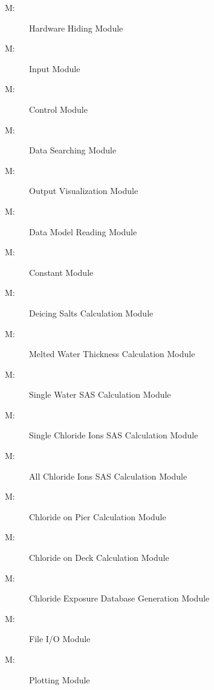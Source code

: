 \documentclass[12pt, titlepage]{article}
\newcounter{mnum}
\newcommand{\mthemnum}{M\themnum}
\begin{document}
\begin{description}
\item [ \mthemnum \label{mHardware}:] Hardware Hiding Module
\item [ \mthemnum \label{mInput}:] Input Module
\item [ \mthemnum \label{mControl}:] Control Module
\item [ \mthemnum \label{mSearch}:] Data Searching Module
\item [ \mthemnum \label{mOutput}:] Output Visualization Module
\item [ \mthemnum \label{mDataModel}:] Data Model Reading Module 
\item [ \mthemnum \label{mConstant}:] Constant Module 
\item [ \mthemnum \label{mCalculation_step1}:] Deicing Salts Calculation Module 
\item [ \mthemnum \label{mCalculation_step2}:] Melted Water Thickness Calculation Module 
\item [ \mthemnum \label{mCalculation_step3}:] Single Water SAS Calculation Module 
\item [ \mthemnum \label{mCalculation_step4}:] Single Chloride Ions SAS Calculation Module 
\item [ \mthemnum \label{mCalculation_step5}:] All Chloride Ions SAS Calculation Module 
\item [ \mthemnum \label{mCalculation_step6}:] Chloride on Pier Calculation Module 
\item [ \mthemnum \label{mCalculation_deck}:] Chloride on Deck  Calculation Module 
\item [ \mthemnum \label{mCalculation_result}:] Chloride Exposure Database Generation Module
\item [ \mthemnum \label{mFileIO}:] File I/O Module
\item [ \mthemnum \label{mPlot}:] Plotting Module
\end{description}
\end{document}
